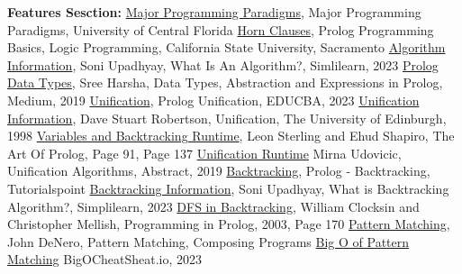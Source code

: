 \documentclass{article}
\theoremstyle{theorem}
\theoremstyle{definition}
\theoremstyle{remark}
\begin{document}
\begin{thebibliography}{99}
\noindent\textbf{Features Sesction:}\newline
{} \href{https://www.cs.ucf.edu/~leavens/ComS541Fall97/hw-pages/paradigms/major.html}{Major Programming Paradigms}, Major Programming Paradigms, University of Central Florida
 \href{https://athena.ecs.csus.edu/~mei/logicp/prolog.html}{Horn Clauses}, Prolog Programming Basics, Logic Programming, California State University, Sacramento
 \href{https://www.simplilearn.com/tutorials/data-structure-tutorial/what-is-an-algorithm}{Algorithm Information}, Soni Upadhyay, What Is An Algorithm?, Simlilearn, 2023
 \href{https://medium.com/@donepudisreeharsha/data-types-abstraction-expressions-in-prolog-6c7251477677}{Prolog Data Types}, Sree Harsha, Data Types, Abstraction and Expressions in Prolog, Medium, 2019
 \href{https://www.educba.com/prolog-unification/}{Unification}, Prolog Unification, EDUCBA, 2023
 \href{https://www.dai.ed.ac.uk/groups/ssp/bookpages/quickprolog/node12.html}{Unification Information}, Dave Stuart Robertson, Unification, The University of Edinburgh, 1998
 \href{https://cliplab.org/~logalg/doc/The_Art_of_Prolog.pdf}{Variables and Backtracking Runtime}, Leon Sterling and Ehud Shapiro, The Art Of Prolog, Page 91, Page 137
\href{https://link.springer.com/chapter/10.1007/978-3-030-24986-1_48}{Unification Runtime} Mirna Udovicic, Unification Algorithms, Abstract, 2019
 \href{https://www.tutorialspoint.com/prolog/prolog_backtracking.htm#:~:text=Backtracking}{Backtracking}, Prolog - Backtracking, Tutorialspoint
 \href{https://www.simplilearn.com/tutorials/data-structure-tutorial/backtracking-algorithm}{Backtracking Information}, Soni Upadhyay, What is Backtracking Algorithm?, Simplilearn, 2023
 \href{https://athena.ecs.csus.edu/~mei/logicp/Programming_in_Prolog.pdf}{DFS in Backtracking}, William Clocksin and Christopher Mellish, Programming in Prolog, 2003, Page 170
 \href{https://composingprograms.com/pages/45-unification.html}{Pattern Matching}, John DeNero, Pattern Matching, Composing Programs \newline
{} \href{https://bigocheatsheet.io/}{Big O of Pattern Matching} BigOCheatSheat.io, 2023


\end{thebibliography}
\end{document}
